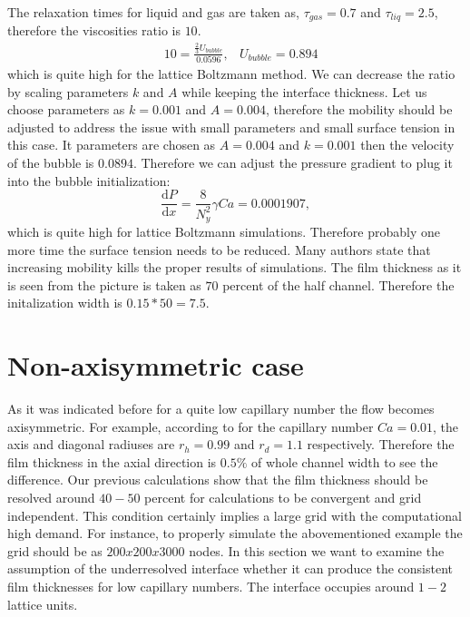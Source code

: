 \documentclass{article}
\begin{document}
The relaxation times for liquid and gas are taken as, $\tau_{gas}=0.7$ and $\tau_{liq}=2.5$,
therefore the viscosities ratio is $10$.
\begin{equation}
\begin{aligned}
&10=\frac{\frac{2}{3} U_{bubble}}{0.0596},
&U_{bubble}=0.894
\end{aligned}
\end{equation}
which is quite high for the lattice Boltzmann method. We can decrease the ratio by scaling
parameters $k$ and $A$ while keeping the interface thickness. Let us choose parameters as $k=0.001$
and $A=0.004$, therefore the mobility should be adjusted to address the issue with small parameters
and small surface tension in this case. It parameters are chosen as $A=0.004$ and $k=0.001$ then
the velocity of the bubble is  $0.0894$. Therefore we can adjust the pressure gradient to plug it
into the bubble initialization:
\begin{equation}
\frac{\mathrm{d}P}{\mathrm{d}x}=\frac{8}{N_y^2} \gamma Ca=0.0001907,
\end{equation}
which is quite high for lattice Boltzmann simulations. Therefore probably one more time the surface
tension needs to be reduced. {\color{red} Many authors state that increasing mobility kills the
proper results of simulations}. 
The film thickness as it is seen from the picture is taken as $70$ percent of the half channel.
Therefore the initalization width is $0.15*50=7.5$. 

\section{Non-axisymmetric case}
As it was indicated before for a quite low capillary number the flow becomes axisymmetric. For
example, according to \cite{heil-threedim} for the capillary
number $Ca=0.01$, the axis and diagonal radiuses are $r_h=0.99$ and $r_d=1.1$ respectively.
Therefore the film thickness in the axial direction is  $0.5\%$ of whole channel width to see the
difference. Our previous calculations \cite{kuzmin-binary2d} show that the film thickness should be
 resolved around $40-50$ percent for calculations to be convergent and grid independent. This
condition certainly implies a large grid with the computational high demand. For instance, to
properly simulate the abovementioned example the grid should be as 
$200x200x3000$ nodes. In this section we want to examine the assumption of the underresolved
interface whether it can produce the consistent film thicknesses for low capillary numbers. The
interface occupies around $1-2$ lattice units. 
\end{document}
